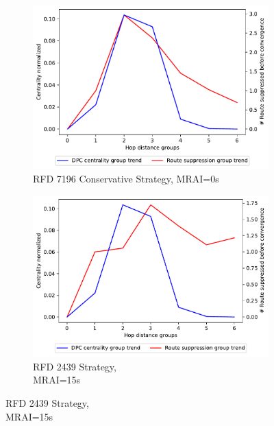 \begin{figure}[H]
\begin{subfigure}[b]{0.325\textwidth}
     \end{subfigure}
     \hfill
     \begin{subfigure}[b]{0.325\textwidth}
         \centering
         \includegraphics[width=\textwidth]{images/RFD/miceVSelephants/MultiMRAI/0/elephants/cisco_1000_RFD_7196_conservative_nodeConvergence_centVSsup_trend.pdf}
         \caption{RFD 7196 Conservative Strategy, MRAI=0s}
         \label{fig:1000_7196RFDC_centVSsup_elephants}
     \end{subfigure}
     \vfill
     \begin{subfigure}[b]{0.325\textwidth}
         \centering
         \includegraphics[width=\textwidth]{images/RFD/miceVSelephants/MultiMRAI/15/elephants/cisco_1000_RFD_nodeConvergence_centVSsup_trend.pdf}
         \caption{RFD 2439 Strategy, \\MRAI=15s}
         \label{fig:1000_2439RFD_centVSsup_elephants}

\end{subfigure}
\end{figure}
